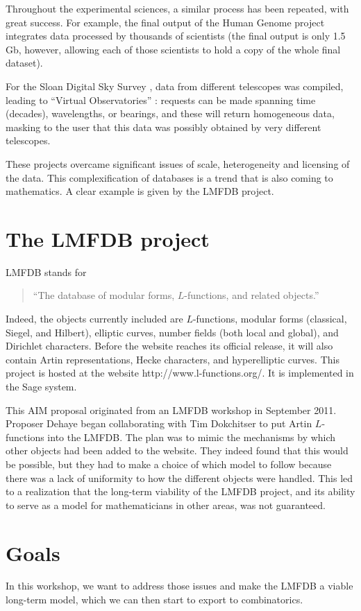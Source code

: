 \documentclass{article}
\begin{document}
Throughout the experimental sciences,  a similar process has been repeated, with great success. For example,
%
the final output of the Human Genome project \cite{HGP} integrates data processed by thousands of scientists (the final output is only 1.5 Gb, however, allowing each of those scientists to hold a copy of the whole final dataset).

For the Sloan Digital Sky Survey \cite{SDSS},  data from different telescopes was compiled, leading to ``Virtual Observatories'' \cite{virtualobservatory}: requests can be made spanning time (decades), wavelengths, or bearings, and these will return homogeneous data, masking to the user that this data was  possibly obtained by very different telescopes. 

These projects overcame significant issues of scale, heterogeneity and licensing of the data. 
This complexification of databases is a trend that is also coming to mathematics. A clear example is given by the LMFDB project. 

\section{The LMFDB project}
LMFDB stands for  
\begin{quote}
``The database of modular forms, $L$-functions, and related objects.''
\end{quote}
Indeed, the objects currently included are $L$-functions, modular forms (classical, Siegel, and Hilbert), elliptic curves, number fields (both local and global), and Dirichlet characters.
Before the website reaches its official release, it will also contain Artin representations, Hecke characters, and hyperelliptic curves. This project is hosted at the website  \textsf{http://www.l-functions.org/}. It is implemented in the \textsf{Sage} system. 

This AIM proposal originated from an LMFDB workshop in September 2011. Proposer Dehaye began collaborating with Tim Dokchitser to put Artin $L$-functions into the LMFDB.  The plan was to mimic the mechanisms by which other objects had been added to the website. They indeed found that this would be possible, but they had to make a choice of which model to follow because there was a lack of uniformity to how the different objects were handled. This led to a realization that the long-term viability of the LMFDB project, and its ability to serve as a model for mathematicians in other areas, was not guaranteed.

\section{Goals}
In this workshop, we want to address those issues and make the LMFDB a viable long-term model, which we can then start to export to combinatorics.
\end{document}
